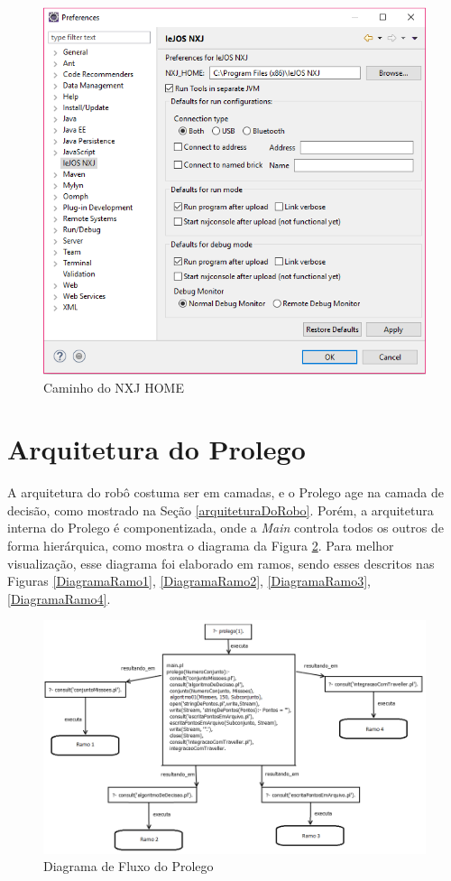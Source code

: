 \FloatBarrier
\begin{figure}[!h]
\centering
\includegraphics[keepaspectratio=true,scale=0.7]{figuras/NXJHOME.png}
\caption{Caminho do NXJ HOME}
\label{nxjhome}
\end{figure}
	
	
	
\section{Arquitetura do Prolego}\label{arquiteturaProlego}
	A arquitetura do robô costuma ser em camadas, e o Prolego age na camada de decisão, como mostrado na Seção \ref{arquiteturaDoRobo}. Porém, a arquitetura interna do Prolego é componentizada, onde a \textit{Main} controla todos os outros de forma hierárquica, como mostra o diagrama da Figura \ref{DiagramaArvoreInicial}. Para melhor visualização, esse diagrama foi elaborado em ramos, sendo esses descritos nas Figuras \ref{DiagramaRamo1}, \ref{DiagramaRamo2}, \ref{DiagramaRamo3}, \ref{DiagramaRamo4}.
	
\FloatBarrier
\begin{figure}[!h]
\centering
\includegraphics[keepaspectratio=true,scale=0.7]{figuras/DiagramaArvoreInicial.png}
\caption{Diagrama de Fluxo do Prolego}
\label{DiagramaArvoreInicial}
\end{figure}


